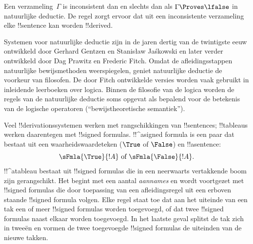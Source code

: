 \documentclass[openany]{memoir}
\begin{document}
Een verzameling~$\Gamma$ is inconsistent dan en slechts dan als
$\Gamma \Proves \lfalse$ in natuurlijke deductie. De regel \FalseInt{}
zorgt ervoor dat uit een inconsistente verzameling elke !!{sentence}
kan worden !!{derive}d.

Systemen voor natuurlijke deductie zijn in de jaren dertig van de
twintigste eeuw ontwikkeld door Gerhard Gentzen en Stanis\l{}aw
Ja\'skowski en later verder ontwikkeld door Dag Prawitz en Frederic
Fitch. Omdat de afleidingsstappen natuurlijke bewijsmethoden
weerspiegelen, geniet natuurlijke deductie de voorkeur van filosofen.
De door Fitch ontwikkelde versies worden vaak gebruikt in inleidende
leerboeken over logica. Binnen de filosofie van de logica worden de
regels van de natuurlijke deductie soms opgevat als bepalend voor de
betekenis van de logische operatoren (``bewijstheoretische semantiek'').
\endgroup

\begingroup
\def\olfilename{OLP-0067}
\def\olfilepath{content/first-order-logic/proof-systems/}
\hypertarget{unit-OLP-0067}{}



      {}
      {}


Veel !!{derivation}ssystemen werken met rangschikkingen van
!!{sentence}s; !!{tableau}s werken daarentegen met !!{signed formula}s.
!!^a{signed formula} is een paar dat bestaat uit een
waarheidswaardeteken ($\True$ of $\False$) en !!a{sentence}:
\[
\sFmla{\True}{!A} \text{ of } \sFmla{\False}{!A}.
\]
!!^a{tableau} bestaat uit !!{signed formula}s die in een neerwaarts
vertakkende boom zijn gerangschikt. Het begint met een aantal
\emph{aannames} en wordt voortgezet met !!{signed formula}s die door
toepassing van een afleidingsregel uit een erboven staande
!!{signed formula} volgen. Elke regel staat toe dat aan het uiteinde
van een tak een of meer !!{signed formula}s worden toegevoegd, of dat
twee !!{signed formula}s naast elkaar worden toegevoegd. In het
laatste geval splitst de tak zich in tweeën en vormen de twee
toegevoegde !!{signed formula}s de uiteinden van de nieuwe takken.
\end{document}
